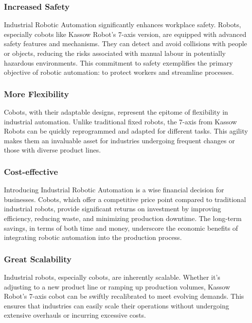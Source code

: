     \subsubsection{Increased Safety}

    Industrial Robotic Automation significantly enhances workplace safety. Robots, especially cobots like Kassow Robot's 7-axis version, are equipped with advanced safety features and mechanisms. 
    They can detect and avoid collisions with people or objects, reducing the risks associated with manual labour in potentially hazardous environments. This commitment to safety exemplifies the primary objective of robotic automation: to protect workers and streamline processes.

    \subsubsection{More Flexibility}
    Cobots, with their adaptable designs, represent the epitome of flexibility in industrial automation. 
    Unlike traditional fixed robots, the 7-axis from Kassow Robots can be quickly reprogrammed and adapted for different tasks. This agility makes them an invaluable asset for industries undergoing frequent changes or those with diverse product lines.

    \subsubsection{Cost-effective}
    Introducing Industrial Robotic Automation is a wise financial decision for businesses. Cobots, which offer a competitive price point compared to traditional industrial robots, provide significant returns on investment by improving efficiency, reducing waste, and minimizing production downtime. 
    The long-term savings, in terms of both time and money, underscore the economic benefits of integrating robotic automation into the production process.

    \subsubsection{Great Scalability}
    Industrial robots, especially cobots, are inherently scalable. Whether it's adjusting to a new product line or ramping up production volumes, Kassow Robot's 7-axis cobot can be swiftly recalibrated to meet evolving demands. 
    This ensures that industries can easily scale their operations without undergoing extensive overhauls or incurring excessive costs.

